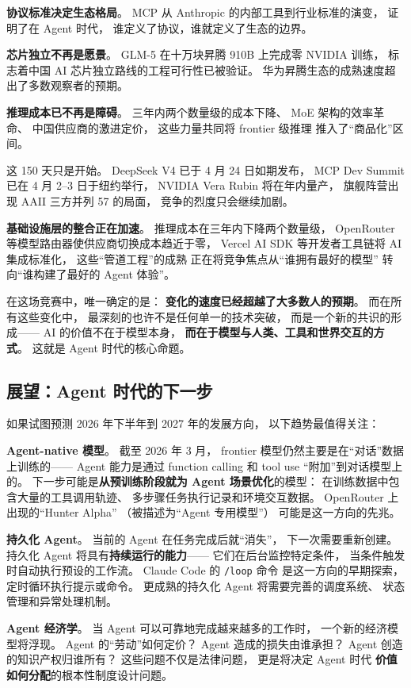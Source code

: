 \textbf{协议标准决定生态格局}。
MCP 从 Anthropic 的内部工具到行业标准的演变，
证明了在 Agent 时代，
谁定义了协议，谁就定义了生态的边界。

\textbf{芯片独立不再是愿景}。
GLM-5 在十万块昇腾 910B 上完成零 NVIDIA 训练，
标志着中国 AI 芯片独立路线的工程可行性已被验证。
华为昇腾生态的成熟速度超出了多数观察者的预期。

\textbf{推理成本已不再是障碍}。
三年内两个数量级的成本下降、
MoE 架构的效率革命、
中国供应商的激进定价，
这些力量共同将 frontier 级推理
推入了“商品化”区间。

这 150 天只是开始。
DeepSeek V4 已于 4 月 24 日如期发布，
MCP Dev Summit 已在 4 月 2--3 日于纽约举行，
NVIDIA Vera Rubin 将在年内量产，
旗舰阵营出现 AAII 三方并列 57 的局面，
竞争的烈度只会继续加剧。

\textbf{基础设施层的整合正在加速}。
推理成本在三年内下降两个数量级，
OpenRouter 等模型路由器使供应商切换成本趋近于零，
Vercel AI SDK 等开发者工具链将 AI 集成标准化，
这些“管道工程”的成熟
正在将竞争焦点从“谁拥有最好的模型”
转向“谁构建了最好的 Agent 体验”。

在这场竞赛中，唯一确定的是：
\textbf{变化的速度已经超越了大多数人的预期}。
而在所有这些变化中，
最深刻的也许不是任何单一的技术突破，
而是一个新的共识的形成——
AI 的价值不在于模型本身，
\textbf{而在于模型与人类、工具和世界交互的方式}。
这就是 Agent 时代的核心命题。

\subsection{展望：Agent 时代的下一步}

如果试图预测 2026 年下半年到 2027 年的发展方向，
以下趋势最值得关注：

\textbf{Agent-native 模型}。
截至 2026 年 3 月，
frontier 模型仍然主要是在“对话”数据上训练的——
Agent 能力是通过 function calling 和 tool use
“附加”到对话模型上的。
下一步可能是\textbf{从预训练阶段就为 Agent 场景优化}的模型：
在训练数据中包含大量的工具调用轨迹、
多步骤任务执行记录和环境交互数据。
OpenRouter 上出现的“Hunter Alpha”
（被描述为“Agent 专用模型”）
可能是这一方向的先兆。

\textbf{持久化 Agent}。
当前的 Agent 在任务完成后就“消失”，
下一次需要重新创建。
持久化 Agent 将具有\textbf{持续运行的能力}——
它们在后台监控特定条件，
当条件触发时自动执行预设的工作流。
Claude Code 的 \texttt{/loop} 命令
是这一方向的早期探索，
定时循环执行提示或命令。
更成熟的持久化 Agent
将需要完善的调度系统、
状态管理和异常处理机制。

\textbf{Agent 经济学}。
当 Agent 可以可靠地完成越来越多的工作时，
一个新的经济模型将浮现。
Agent 的“劳动”如何定价？
Agent 造成的损失由谁承担？
Agent 创造的知识产权归谁所有？
这些问题不仅是法律问题，
更是将决定 Agent 时代
\textbf{价值如何分配}的根本性制度设计问题。

